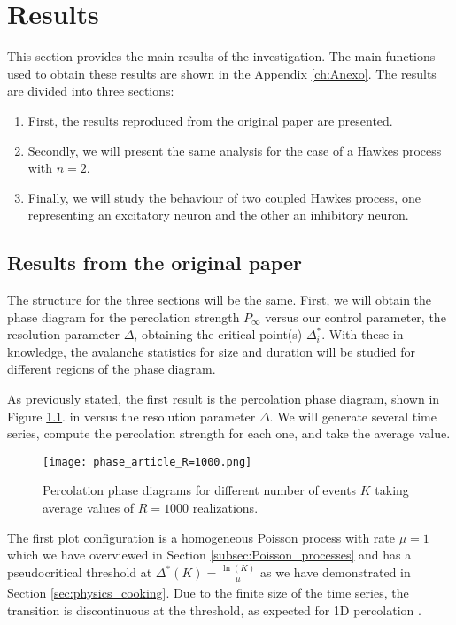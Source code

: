 \chapter{Results} \label{ch:resultados}

This section provides the main results of the investigation. The main functions used to obtain these results are shown in the Appendix \ref{ch:Anexo}. 
The results are divided into three sections:
\begin{enumerate}
    \item First, the results reproduced from the original paper \cite{notarmuzi2021percolation} are presented.
    \item Secondly, we will present the same analysis for the case of a Hawkes process with $n=2$.
    \item Finally, we will study the behaviour of two coupled Hawkes process, one representing an excitatory neuron and the other an inhibitory neuron.
\end{enumerate}

\section{Results from the original paper}

The structure for the three sections will be the same. First, we will obtain the phase diagram for the percolation strength $P_{\infty}$ versus our control parameter, the resolution parameter 
$\Delta$, obtaining the critical point(s) $\Delta^*_{i}$. With these in knowledge, the avalanche statistics for size and duration will be studied for different regions 
of the phase diagram.  

As previously stated, the first result is the percolation phase diagram, shown in Figure \ref{f:phase_diagram_article}. 
in versus the resolution parameter $\Delta$. We will generate several time series, compute the percolation strength for each one, and take the average value.

\begin{figure}[H]
    \centering
    \texttt{[image: phase\_article\_R=1000.png]}
    \caption{Percolation phase diagrams for different number of events $K$ taking average values of $R=1000$ realizations.}
    \label{f:phase_diagram_article}
\end{figure}

The first plot configuration is a homogeneous Poisson process with rate $\mu=1$ which we have overviewed in Section \ref{subsec:Poisson_processes} and has a pseudocritical threshold at 
$\Delta^*(K)=\frac{\ln(K)}{\mu}$ as we have demonstrated in Section \ref{sec:physics_cooking}. Due to the finite size of the time series, the transition is discontinuous at 
the threshold, as expected for 1D percolation \cite{stauffer2018introduction}.

